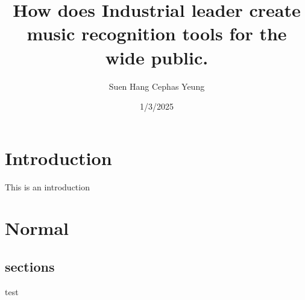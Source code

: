 \documentclass[twoside]{report}
\title{How does Industrial leader create music recognition tools for the wide public.}
\author{Suen Hang Cephas Yeung}
\date{1/3/2025}
\begin{document}
\maketitle
\tableofcontents

\chapter{Introduction}
This is an introduction
\chapter{Normal}
\section{sections}
test



\end{document}

